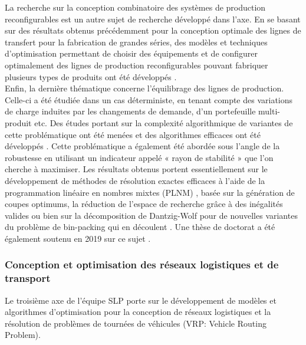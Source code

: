La recherche sur la conception combinatoire des systèmes de production reconfigurables est un autre sujet de recherche développé dans l’axe. En se basant sur des résultats obtenus précédemment pour la conception optimale des lignes de transfert pour la fabrication de grandes séries, des modèles et techniques d'optimisation permettant de choisir des équipements et de configurer optimalement des lignes de production reconfigurables pouvant fabriquer plusieurs types de produits ont été développés \cite{Battaia2020,battaia:hal-01435089,battaia:hal-01523726,Dolgui2019,Dolgui2020, Yelles-Chaouche2020}. \\

Enfin, la dernière thématique concerne l’équilibrage des lignes de production. Celle-ci a été étudiée dans un cas déterministe, en tenant compte des variations de charge induites par les changements de demande, d’un portefeuille multi-produit etc. Des études portant sur la complexité algorithmique de variantes de cette problématique ont été menées et des algorithmes efficaces ont été développés \cite{delorme:emse-01840007,dolgui:hal-01688688}. Cette problématique a également été abordée sous l’angle de la robustesse en utilisant un indicateur appelé « rayon de stabilité » que l’on cherche à maximiser. Les résultats obtenus portent essentiellement sur le développement de méthodes de résolution exactes efficaces à l’aide de la programmation linéaire en nombres mixtes (PLNM) \cite{Rossi2016}, basée sur la génération de coupes optimums, la réduction de l’espace de recherche grâce à des inégalités valides \cite{Pirogov2017,Pirogov2018a,Pirogov2018b} ou bien sur la décomposition de Dantzig-Wolf pour de nouvelles variantes du problème de bin-packing qui en découlent \cite{Schpler2017a,Schpler2017b,Schpler2020}. Une thèse de doctorat a été également soutenu en 2019 sur ce sujet \cite{Pirogov2019}.
  

  \subsubsection{Conception et optimisation des réseaux logistiques et de transport}
  		
   
Le troisième axe de l'équipe SLP porte sur le développement de modèles et algorithmes d'optimisation pour la conception de réseaux logistiques et la résolution de problèmes de tournées de véhicules (VRP: Vehicle Routing Problem).\\

